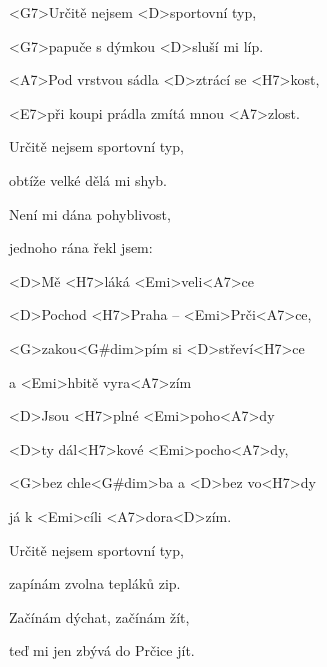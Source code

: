 

\zs
<G7>Určitě nejsem <D>sportovní typ,

<G7>papuče s dýmkou <D>sluší mi líp.

<A7>Pod vrstvou sádla <D>ztrácí se <H7>kost,

<E7>při koupi prádla zmítá mnou <A7>zlost.
\ks

\zs
Určitě nejsem sportovní typ,

obtíže velké dělá mi shyb.

Není mi dána pohyblivost,

jednoho rána řekl jsem: 
\ks

\zr
<D>Mě <H7>láká <Emi>veli<A7>ce

<D>Pochod <H7>Praha – <Emi>Prči<A7>ce,

<G>zakou<G#dim>pím si <D>střeví<H7>ce

a <Emi>hbitě vyra<A7>zím

<D>Jsou <H7>plné <Emi>poho<A7>dy

<D>ty dál<H7>kové <Emi>pocho<A7>dy,

<G>bez chle<G#dim>ba a <D>bez vo<H7>dy

já k <Emi>cíli <A7>dora<D>zím.
\kr

\zs
Určitě nejsem sportovní typ,

zapínám zvolna tepláků zip.

Začínám dýchat, začínám žít,

teď mi jen zbývá do Prčice jít.
\ks

\zr

\kr

\kp
